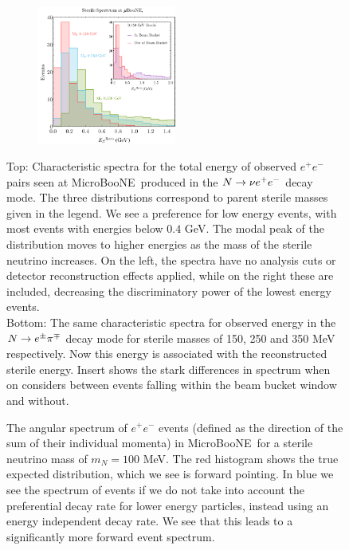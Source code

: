 \documentclass[11pt, a4paper]{article}
\def\muboone{MicroBooNE}
\def\ster{\ensuremath N}
\begin{document}
\begin{figure}[t]
%

\begin{subfigure}[t]{\textwidth}
\center
%
\large

\resizebox{\columnwidth}{!}{}
%
%
\end{subfigure}
~\\
\begin{subfigure}[t]{\textwidth}
	\center
\includegraphics[width=0.5\textwidth]{figures/sterilecomparason.pdf}
\end{subfigure}

\caption{\label{fig:spectrum_ee} Top: Characteristic spectra for the total energy of observed  $e^+e^-$ pairs seen at \muboone\ produced in the $\ster \to \nu e^+e^-$ decay mode. The three distributions correspond to parent sterile masses given in the legend. We see a preference for low energy events, with most events with energies below $0.4$ GeV. The modal peak of the distribution moves to higher energies as the mass of the sterile neutrino increases. On the left, the spectra have no analysis cuts or detector reconstruction effects applied, while on the right these are included, decreasing the discriminatory power of the lowest energy events.\\
Bottom: The same characteristic spectra for observed energy in the  $\ster\rightarrow e^\pm \pi^\mp$ decay mode for sterile masses of 150,
250 and 350 MeV respectively. Now this energy is associated with the reconstructed sterile energy. Insert shows the stark differences in spectrum when on considers between events falling
within the beam bucket window and without.}
\end{figure}




\begin{figure}[t]
%
\center
%
\Large

\resizebox{0.8\columnwidth}{!}{}
%
\caption{\label{fig:spectrum_ee_angular} The angular spectrum of $e^+e^-$
events (defined as the direction of the sum of their individual momenta) in
\muboone\ for a sterile neutrino mass of $m_N = 100$ MeV. The red histogram
shows the true expected distribution, which we see is forward pointing. In blue
we see the spectrum of events if we do not take into account the preferential
decay rate for lower energy particles, instead using an energy independent
decay rate. We see that this leads to a significantly more forward event 
spectrum.}
%
\end{figure}
\end{document}
